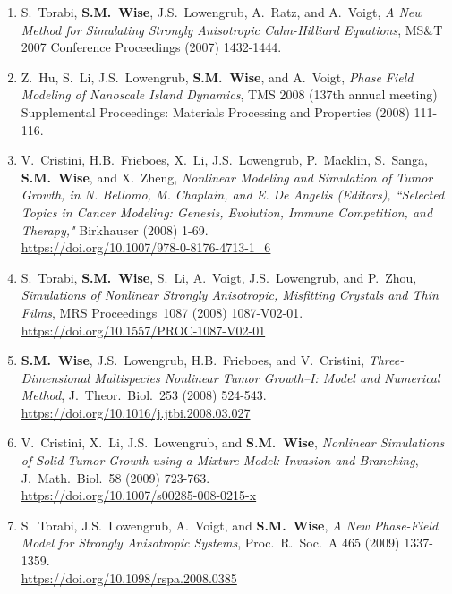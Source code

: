\documentclass[11pt]{letter}
\begin{document}
\begin{enumerate}
	\item
S.~Torabi, \textbf{S.M.~Wise}, J.S.~Lowengrub, A.~Ratz, and A.~Voigt, {\sl A New Method for Simulating Strongly Anisotropic Cahn-Hilliard Equations}, MS\&T 2007 Conference Proceedings (2007) 1432-1444.	

	\item
Z.~Hu, S.~Li, J.S.~Lowengrub, \textbf{S.M.~Wise}, and A.~Voigt, {\sl Phase Field Modeling of Nanoscale Island Dynamics}, TMS 2008 (137th annual meeting) Supplemental Proceedings: Materials Processing and Properties (2008) 111-116.

	\item
V.~Cristini, H.B.~Frieboes, X.~Li, J.S.~Lowengrub, P.~Macklin, S.~Sanga, \textbf{S.M.~Wise}, and X.~Zheng, {\sl Nonlinear Modeling and Simulation of Tumor Growth, in N. Bellomo, M. Chaplain, and E. De Angelis (Editors), ``Selected Topics in Cancer Modeling: Genesis, Evolution, Immune Competition, and Therapy,"}  Birkhauser (2008) 1-69.
	\\
\url{https://doi.org/10.1007/978-0-8176-4713-1_6}

	\item
S.~Torabi, \textbf{S.M.~Wise}, S.~Li, A.~Voigt, J.S.~Lowengrub, and P.~Zhou, {\sl Simulations of Nonlinear Strongly Anisotropic, Misfitting Crystals and Thin Films}, MRS Proceedings~1087 (2008) 1087-V02-01. 
	\\
\url{https://doi.org/10.1557/PROC-1087-V02-01}

	\item
\textbf{S.M.~Wise}, J.S.~Lowengrub, H.B.~Frieboes, and V.~Cristini, {\sl Three-Dimensional Multispecies Nonlinear Tumor Growth--I: Model and Numerical Method}, J.~Theor.~Biol.~253 (2008) 524-543.
	\\
\url{https://doi.org/10.1016/j.jtbi.2008.03.027}

	\item
V.~Cristini, X.~Li, J.S.~Lowengrub, and \textbf{S.M.~Wise}, {\sl Nonlinear Simulations of Solid Tumor Growth using a Mixture Model: Invasion and Branching}, J.~Math.~Biol.~58 (2009) 723-763.
	\\
\url{https://doi.org/10.1007/s00285-008-0215-x}

	\item
S.~Torabi, J.S.~Lowengrub, A.~Voigt, and \textbf{S.M.~Wise}, {\sl A New Phase-Field Model for Strongly Anisotropic Systems}, Proc.~R.~Soc.~A 465 (2009) 1337-1359.
	\\
\url{https://doi.org/10.1098/rspa.2008.0385}



\end{enumerate}
\end{document}
